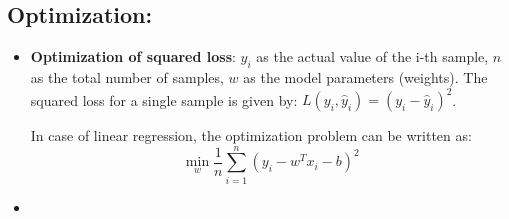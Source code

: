 \documentclass[16pt]{article}
\begin{document}
	\subsection{Optimization:}
	\begin{itemize}
		\item \textbf{Optimization of squared loss}: \(y_i\) as the actual value of the i-th sample,  \(n\) as the total number of samples, \(w\) as the model parameters (weights). The squared loss for a single sample is given by: $ L(y_i, \hat{y}_i) = (y_i - \hat{y}_i)^2 $.
		
		In case of linear regression, the optimization problem can be written as:
		$$\min_{w} \frac{1}{n} \sum_{i=1}^{n} (y_i - w^T x_i - b)^2$$
		\item 
	\end{itemize}
	
\end{document}
